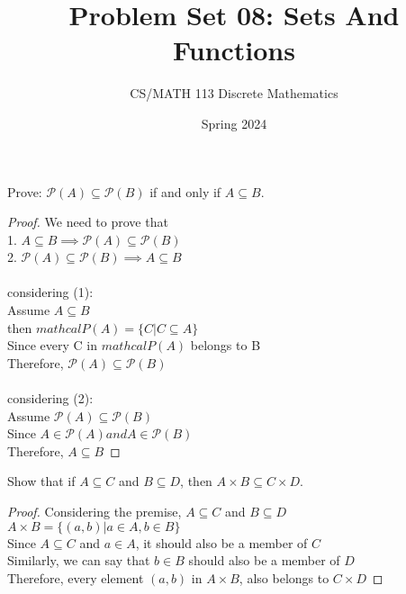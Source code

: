\documentclass[a4paper]{exam}
\title{Problem Set 08: Sets And Functions}
\author{CS/MATH 113 Discrete Mathematics}
\date{Spring 2024}
\theoremstyle{definition}
\begin{document}
\maketitle

\begin{questions}
\question 
  Prove: $\mathcal{P}(A) \subseteq \mathcal{P}(B)$ if and only if $A \subseteq B$.

  \begin{solution}
    \begin{proof}
      We need to prove that \\
      1. $A \subseteq B \implies \mathcal{P}(A) \subseteq \mathcal{P}(B)$\\
      2. $\mathcal{P}(A) \subseteq \mathcal{P}(B) \implies A \subseteq B$\\\\
      considering (1):\\
      Assume $A \subseteq B$\\
      then \(mathcal{P}(A) = \{C | C \subseteq A\}\)\\
      Since every C in \(mathcal{P}(A)\) belongs to B\\
      Therefore, \(\mathcal{P}(A) \subseteq \mathcal{P}(B)\)\\\\
      considering (2):\\
      Assume $\mathcal{P}(A) \subseteq \mathcal{P}(B)$\\
      Since \(A \in \mathcal{P}(A) and A \in \mathcal{P}(B)\)\\
      Therefore, \(A \subseteq B\)

      
    \end{proof}
  \end{solution}


\question Show that if \(A \subseteq C\) and \(B \subseteq D\), then \(A \times B \subseteq C \times D\).

  \begin{solution}
    \begin{proof}
    Considering the premise, \(A \subseteq C\) and \(B \subseteq D\)\\
    \(A \times B = \{(a,b) | a \in A, b \in B\}\)\\
    Since \(A \subseteq C\) and \(a \in A\), it should also be a member of \(C\)\\
    Similarly, we can say that \(b \in B\) should also be a member of \(D\)\\
    Therefore, every element \((a,b)\) in \(A \times B\), also belongs to \(C \times D\)
    \end{proof}
  \end{solution}
  

\end{questions}
\end{document}

